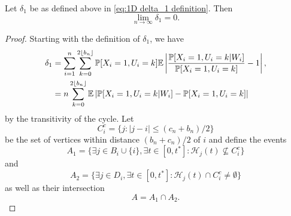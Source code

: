 	\begin{lemma}
	\label{lem:delta1 goes to 0}
		Let $\delta_1$ be as defined above in \eqref{eq:1D delta_1 definition}. Then
		\begin{equation}
			\lim_{n\rightarrow\infty} \delta_1 = 0.
		\end{equation}
	\end{lemma}
	\begin{proof}
	Starting with the definition of $\delta_1$, we have
		\begin{align}
			\delta_1 &= %
			\sum_{i = 1}^n \sum_{k = 0}^{2 \lfloor b_n\rfloor} \prob[X_i = 1, U_i = k] \expect \left| \frac{\prob[X_i = 1, U_i = k|W_i]}{\prob[X_i = 1, U_i = k]} - 1 \right|,\\
			&= n \sum_{k = 0}^{2 \lfloor b_n\rfloor} \expect \left|\prob[X_i = 1, U_i = k|W_i] - \prob[X_i = 1, U_i = k] \right|%
			\label{eq: delta1 line 2}
		\end{align}
		by the transitivity of the cycle.
		Let
		\begin{equation}
			C_i^c = \{j : |j - i| \leq (c_n + b_n)/2\}
		\end{equation}
		be the set of vertices within distance $(b_n + c_n)/2$ of $i$ and define the events
		\begin{equation}
			A_1 = \{\exists j \in B_i \cup \{i\}, \exists t \in [0, t^*] : \mathcal{H}_j(t) \nsubseteq  C_i^c\}
		\end{equation}
		and
		\begin{equation}
			A_2 = \{\exists j \in D_i, \exists t \in [0, t^*] : \mathcal{H}_j(t) \cap C_i^c \neq \emptyset\}
		\end{equation}
		as well as their intersection
		\begin{equation}
			A = A_1 \cap A_2.
		\end{equation}


\end{proof}
